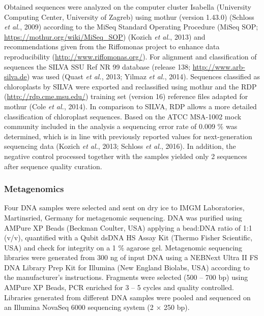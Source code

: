 \documentclass[12pt,]{article}
\begin{document}
Obtained sequences were analyzed on the computer cluster Isabella
(University Computing Center, University of Zagreb) using mothur
(version 1.43.0) (Schloss \emph{et al.}, 2009) according to the MiSeq
Standard Operating Procedure (MiSeq SOP;
\url{https://mothur.org/wiki/MiSeq_SOP}) (Kozich \emph{et al.}, 2013)
and recommendations given from the Riffomonas project to enhance data
reproducibility (\url{http://www.riffomonas.org/}). For alignment and
classification of sequences the SILVA SSU Ref NR 99 database (release
138; \url{http://www.arb-silva.de}) was used (Quast \emph{et al.}, 2013;
Yilmaz \emph{et al.}, 2014). Sequences classified as chloroplasts by
SILVA were exported and reclassified using mothur and the RDP
(\url{http://rdp.cme.msu.edu/}) training set (version 16) reference
files adapted for mothur (Cole \emph{et al.}, 2014). In comparison to
SILVA, RDP allows a more detailed classification of chloroplast
sequences. Based on the ATCC MSA-1002 mock community included in the
analysis a sequencing error rate of 0.009 \si{\percent} was determined,
which is in line with previously reported values for next-generation
sequencing data (Kozich \emph{et al.}, 2013; Schloss \emph{et al.},
2016). In addition, the negative control processed together with the
samples yielded only 2 sequences after sequence quality curation.

\hypertarget{metagenomics}{%
\subsubsection{Metagenomics}\label{metagenomics}}

Four DNA samples were selected and sent on dry ice to IMGM Laboratories,
Martinsried, Germany for metagenomic sequencing. DNA was purified using
AMPure XP Beads (Beckman Coulter, USA) applying a bead:DNA ratio of 1:1
(v/v), quantified with a Qubit dsDNA HS Assay Kit (Thermo Fisher
Scientific, USA) and check for integrity on a 1 \si{\percent} agarose
gel. Metagenomic sequencing libraries were generated from 300 \si{\ng}
of input DNA using a NEBNext Ultra II FS DNA Library Prep Kit for
Illumina (New England Biolabs, USA) according to the manufacturer's
instructions. Fragments were selected (500 -- 700 bp) using AMPure XP
Beads, PCR enriched for 3 -- 5 cycles and quality controlled. Libraries
generated from different DNA samples were pooled and sequenced on an
Illumina NovaSeq 6000 sequencing system (2 × 250 bp).
\end{document}
